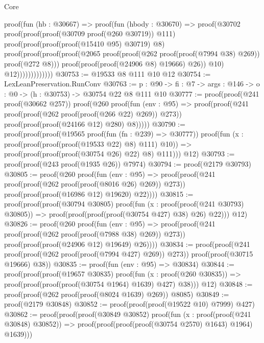 \begin{lexlean}{Core}
\begin{coremodule}
                proof(fun (hb : @30667) =>
                  proof(fun (hbody : @30670) =>
                    proof(@30702
                        proof(proof(proof(@30709 proof(@260 @30719)) @111)
                            proof(proof(proof(proof(@15410 @95) @30719) @8)
                                proof(proof(proof(proof(@2065
                                          proof(proof(@262 proof(proof(@7994 @38) @269))
                                              proof(@272 @8)))
                                        proof(proof(proof(@24906 @8) @19666) @26))
                                      @10)
                                    @12)))))))))))))
@30753 := @19533 @8 @111 @10 @12
@30754 := LexLeanPreservation.RunConv
@30763 := {p : @90} ->
  {fi : @7} -> {args : @146} -> {o : @0} -> (h : @30753) -> @30754 @22 @8 @111 @10
@30777 := proof(proof(@241 proof(@30662 @257))
      proof(@260
          proof(fun (env : @95) =>
            proof(proof(@241 proof(proof(@262 proof(proof(@266 @22) @269)) @273))
                proof(proof(proof(@24166 @12) @280) @8)))))
@30790 := proof(proof(proof(@19565 proof(fun (fn : @239) => @30777))
        proof(fun (x : proof(proof(proof(proof(@19533 @22) @8) @111) @10)) =>
          proof(proof(proof(proof(@30754 @26) @22) @8) @111)))
      @12)
@30793 := proof(proof(@243 proof(@1935 @26)) @7974)
@30794 := proof(@2179 @30793)
@30805 := proof(@260
      proof(fun (env : @95) =>
        proof(proof(@241 proof(proof(@262 proof(proof(@8016 @26) @269)) @273))
            proof(proof(proof(@16986 @12) @19620) @22))))
@30815 := proof(proof(proof(@30794 @30805)
        proof(fun (x : proof(proof(@241 @30793) @30805)) =>
          proof(proof(proof(proof(@30754 @427) @38) @26) @22)))
      @12)
@30826 := proof(@260
      proof(fun (env : @95) =>
        proof(proof(@241 proof(proof(@262 proof(proof(@7988 @38) @269)) @273))
            proof(proof(proof(@24906 @12) @19649) @26))))
@30834 := proof(proof(@241 proof(proof(@262 proof(proof(@7994 @427) @269)) @273))
      proof(proof(@30715 @19666) @38))
@30835 := proof(fun (env : @95) => @30834)
@30844 := proof(proof(proof(@19657 @30835)
        proof(fun (x : proof(@260 @30835)) =>
          proof(proof(proof(proof(@30754 @1964) @1639) @427) @38)))
      @12)
@30848 := proof(proof(@262 proof(proof(@8024 @1639) @269)) @8085)
@30849 := proof(@2179 @30848)
@30852 := proof(proof(proof(@19522 @10) @7999) @427)
@30862 := proof(proof(proof(@30849 @30852)
        proof(fun (x : proof(proof(@241 @30848) @30852)) =>
          proof(proof(proof(proof(@30754 @2570) @1643) @1964) @1639)))

\end{coremodule}
\end{lexlean}
